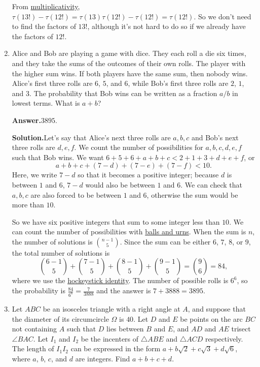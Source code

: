 \documentclass[11pt,paper=letter]{scrartcl}
\newcommand{\ans}[1]{{\sffamily \bfseries Answer.}\;\(\boxed{\text{#1}}\).}
\newcommand{\sol}{{\sffamily \bfseries Solution.}\;}
\newenvironment{rem}%
{\noindent \ignorespaces \small \sffamily \sansmath {\bfseries Remark.}}%
{\ignorespacesafterend}
\begin{document}
\begin{enumerate}[align=left,leftmargin=*,resume]
\begin{rem}
From \href{https://en.wikipedia.org/wiki/Divisor_function#Properties}{multiplicativity}, $\tau(13!) - \tau(12!) = \tau(13)\tau(12!) - \tau(12!) = \tau(12!)$. So we don't need to find the factors of $13!$, although it's not hard to do so if we already have the factors of $12!$.
\end{rem}

\item Alice and Bob are playing a game with dice. They each roll a die six times, and they take the sums of the outcomes of their own rolls. The player with the higher sum wins. If both players have the same sum, then nobody wins. Alice's first three rolls are $6$, $5$, and $6$, while Bob's first three rolls are $2$, $1$, and $3$. The probability that Bob wins can be written as a fraction $a/b$ in lowest terms. What is $a + b$?

\ans{$3895$}

\sol Let's say that Alice's next three rolls are $a, b, c$ and Bob's next three rolls are $d, e, f$. We count the number of possibilities for $a, b, c, d, e, f$ such that Bob wins. We want $6 + 5 + 6 + a + b + c < 2 + 1 + 3 + d + e + f$, or \[
  a + b + c + (7 - d) + (7 - e) + (7 - f) < 10.
\]
Here, we write $7 - d$ so that it becomes a positive integer; because $d$ is between $1$ and $6$, $7 - d$ would also be between $1$ and $6$. We can check that $a, b, c$ are also forced to be between $1$ and $6$, otherwise the sum would be more than $10$.

So we have six positive integers that sum to some integer less than $10$. We can count the number of possibilities with \href{https://en.wikipedia.org/wiki/Stars_and_bars_(combinatorics)#Theorem_one}{balls and urns}. When the sum is $n$, the number of solutions is $\binom{n-1}{5}$. Since the sum can be either $6$, $7$, $8$, or $9$, the total number of solutions is \[
  \binom{6 - 1}{5} + \binom{7 - 1}{5} + \binom{8 - 1}{5} + \binom{9 - 1}{5} = \binom{9}{6} = 84,
\]
where we use the \href{https://en.wikipedia.org/wiki/Hockey-stick_identity}{hockeystick identity}. The number of possible rolls is $6^6$, so the probability is $\frac{84}{6^6} = \frac{7}{3888}$ and the answer is $7 + 3888 = 3895$.

\item Let $ABC$ be an isosceles triangle with a right angle at $A$, and suppose that the diameter of its circumcircle $\Omega$ is $40$. Let $D$ and $E$ be points on the arc $BC$ not containing $A$ such that $D$ lies between $B$ and $E$, and $AD$ and $AE$ trisect $\angle BAC$. Let $I_1$ and $I_2$ be the incenters of $\triangle ABE$ and $\triangle ACD$ respectively. The length of $I_1I_2$ can be expressed in the form $a + b\sqrt{2} + c\sqrt{3} + d\sqrt{6}$, where $a$, $b$, $c$, and $d$ are integers. Find $a + b + c + d$.


\end{enumerate}
\end{document}
